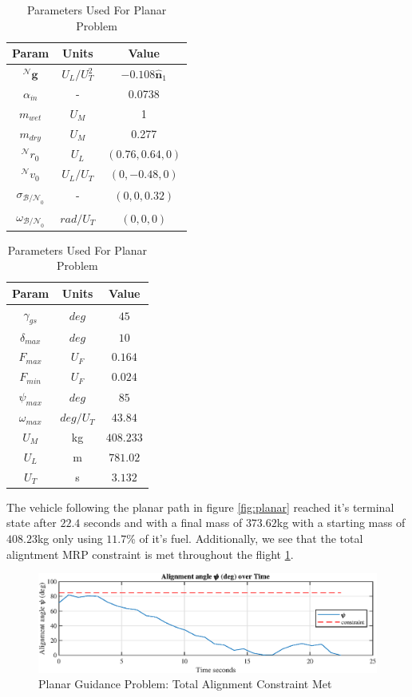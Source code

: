 \begin{table}[ht]
\caption{Parameters Used For Planar Problem}
\centering 
\begin{tabular}{c c c} 
\hline\hline
Param & Units & Value \\ [0.5ex] 
\hline 
$^\mathcal{N}\mathbf{g}$ 		& $U_L/U_T^2$ 	& $-0.108\hat{\mathbf{n}}_1$  \\ 
$\alpha_{\dot{m}}$ 				& - 			& 0.0738  \\
$m_{wet}$ 						& $U_M$ 		& 1  \\
$m_{dry}$ 						& $U_M$ 		& 0.277  \\
$^\mathcal{N}r_{0}$ 			& $U_L$ 		& $(0.76,0.64,0)$  \\
$^\mathcal{N}v_{0}$ 			& $U_L/U_T$	 	& $(0,-0.48,0)$  \\
$\sigma_{\mathcal{B/N}_0}$ 		& - 		& $(0,0,0.32)$  \\
$\omega_{\mathcal{B/N}_0}$ 		& $rad/U_T$ 	& $(0,0,0)$ \\[1ex] 
\hline
\end{tabular}
\begin{tabular}{c c c} 
\hline\hline
Param & Units & Value \\ [0.5ex] 
\hline 
$\gamma_{gs}$ 					& $deg$ 		& $45$  \\ 
$\delta_{max}$	 				& $deg$ 		& $10$  \\
$F_{max}$ 						& $U_F$ 		& $0.164$ \\
$F_{min}$ 						& $U_F$ 		& $0.024$  \\
$\psi_{max}$ 					& $deg$ 		& $85$  \\
$\omega_{max}$ 					& $deg/U_T$	 	& $43.84$  \\
$U_M$ 							& kg 			& $408.233$  \\
$U_L$					 		& m			 	& $781.02$ \\
$U_T$					 		& s			 	& $3.132$ \\[1ex] 
\hline
\end{tabular}
\label{table:tableplanar}
\end{table}

The vehicle following the planar path in figure \ref{fig:planar} reached it's terminal state after $22.4$ seconds and with a final mass of $373.62$kg with a starting mass of $408.23$kg only using $11.7$\% of it's fuel. Additionally, we see that the total aligntment MRP constraint is met throughout the flight \ref{fig:nplanar_align}.

\begin{figure}[!htbp] 
  \centering
  \includegraphics[width=\textwidth]{figs/planar_alignment.eps}
  \caption{Planar Guidance Problem: Total Alignment Constraint Met}
  \label{fig:nplanar_align}
 \end{figure}

